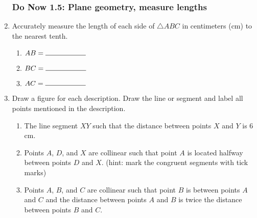 \documentclass[12pt, oneside]{article}
\begin{document}
\begin{enumerate}
\newpage
\subsubsection*{Do Now 1.5: Plane geometry, measure lengths}
\item Accurately measure the length of each side of $\triangle ABC$ in centimeters (cm) to the nearest tenth.
    \bigskip
  \begin{enumerate}
    \item $AB=\rule{2cm}{0.15mm}$ \bigskip
    \item $BC=\rule{2cm}{0.15mm}$ \bigskip
    \item $AC=\rule{2cm}{0.15mm}$
  \end{enumerate}
  \begin{center}
  \end{center}

\item Draw a figure for each description. Draw the line or segment and label all points mentioned in the description.
  \begin{enumerate}
    \item The line segment $XY$ such that the distance between points $X$ and $Y$ is 6 cm. \vspace{2cm}
    \item Points $A$, $D$, and $X$ are collinear such that point $A$ is located halfway between points $D$ and $X$. (hint: mark the congruent segments with tick marks) \vspace{2cm}
    \item Points $A$, $B$, and $C$ are collinear such that point $B$ is between points $A$ and $C$ and the distance between points $A$ and $B$ is twice the distance between points $B$ and $C$. \vspace{2cm}
  \end{enumerate}

\newpage

\end{enumerate}
\end{document}
